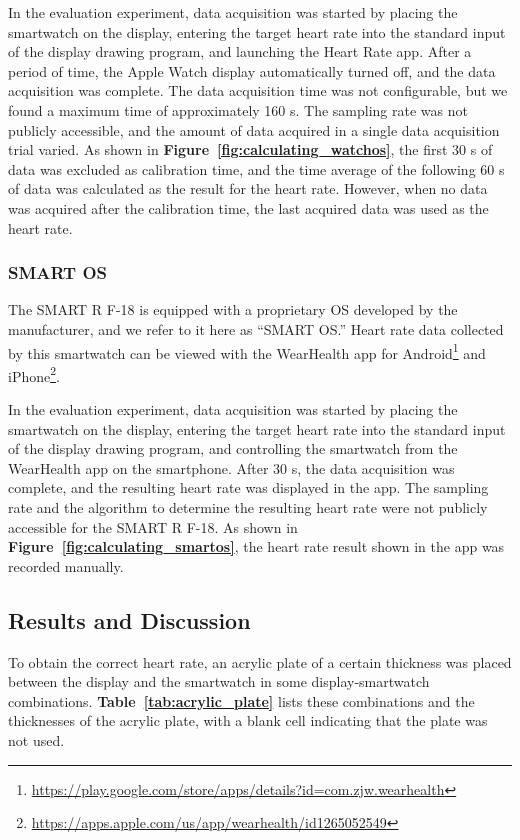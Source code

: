 \documentclass[manuscript,screen,review]{acmart}
\newcommand\figref[1]{\textbf{Figure~\ref{fig:#1}}}
\newcommand\tabref[1]{\textbf{Table~\ref{tab:#1}}}
\begin{document}
In the evaluation experiment, data acquisition was started by placing the smartwatch on the display, entering the target heart rate into the standard input of the display drawing program, and launching the Heart Rate app. After a period of time, the Apple Watch display automatically turned off, and the data acquisition was complete. The data acquisition time was not configurable, but we found a maximum time of approximately 160 s. The sampling rate was not publicly accessible, and the amount of data acquired in a single data acquisition trial varied. As shown in \figref{calculating_watchos}, the first 30 s of data was excluded as calibration time, and the time average of the following 60 s of data was calculated as the result for the heart rate. However, when no data was acquired after the calibration time, the last acquired data was used as the heart rate.

\subsubsection{SMART OS}
The SMART R F-18 is equipped with a proprietary OS developed by the manufacturer, and we refer to it here as ``SMART OS.'' Heart rate data collected by this smartwatch can be viewed with the WearHealth app for Android\footnote{\url{https://play.google.com/store/apps/details?id=com.zjw.wearhealth}} and iPhone\footnote{\url{https://apps.apple.com/us/app/wearhealth/id1265052549}}.\par

In the evaluation experiment, data acquisition was started by placing the smartwatch on the display, entering the target heart rate into the standard input of the display drawing program, and controlling the smartwatch from the WearHealth app on the smartphone. After 30 s, the data acquisition was complete, and the resulting heart rate was displayed in the app. The sampling rate and the algorithm to determine the resulting heart rate were not publicly accessible for the SMART R F-18. As shown in \figref{calculating_smartos}, the heart rate result shown in the app was recorded manually.


\subsection{Results and Discussion}
To obtain the correct heart rate, an acrylic plate of a certain thickness was placed between the display and the smartwatch in some display-smartwatch combinations. \tabref{acrylic_plate} lists these combinations and the thicknesses of the acrylic plate, with a blank cell indicating that the plate was not used.\par
\end{document}
